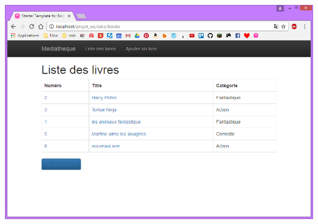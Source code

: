 \documentclass{report}
\begin{document}
		\begin{center}
			\includegraphics[scale=0.4]{img/manuel/DetailAjouterLivre_ajoutdunouveaulivre.png}  
		\end{center}
	
\end{document}
